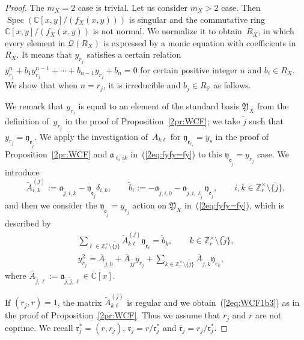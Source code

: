 \documentclass[pdftex]{sigma}
\def\CC{{\mathbb C}}
\def\ZZ{{\mathbb Z}}
\def\PP{{\mathbb P}}
\def\cQ{{\mathcal Q}}
\def\fY{{\mathfrak Y}}
\def\fa{{\mathfrak a}}
\def\fe{{\mathfrak e}}
\def\fr{{\mathfrak r}}
\def\fy{{\mathfrak y}}
\def\tA{{\widetilde A}}
\def\tb{{\widetilde b}}
\def\tj{{\widetilde j}}
\def\BA{{\overline A}}
\def\Bfr{{\overline{\mathfrak r}}}
\def\Spec{\operatorname{Spec}}
\numberwithin{equation}{section}
\begin{document}
\begin{proof}The $m_X=2$ case is trivial.
Let us consider $m_X>2$ case. Then $\Spec(\CC[x,y]/(f_X(x,y)))$ is singular and the commutative ring $\CC[x,y]/(f_X(x,y))$ is not normal.
We normalize it to obtain~$R_X$, in which every element in $\cQ(R_X)$ is expressed by a monic equation with coefficients in $R_X$.
It means that $y_{r_j}$ satisfies a certain relation $y_{r_j}^n+b_1 y_{r_j}^{n-1}+\cdots+b_{n-1} y_{r_j} + b_n=0$ for certain positive integer $n$ and $b_i \in R_X$.
We show that when $n=r_j$, it is irreducible and $b_j \in R_\PP$ as follows.

We remark that $y_{r_j}$ is equal to an element of the standard basis $\fY_X$ from the definition of~$y_{r_j}$ in the proof of Proposition~\ref{2pr:WCF};
we take $\tj$ such that $y_{r_j}=\fy_{\fe_{\tj}}$.
We apply the investigation of~$A_{k\ell}$ for $\fy_{\fe_{\ell_s}}=y_s$ in the proof of Proposition~\ref{2pr:WCF} and $\fa_{\ell_s i k}$ in~(\ref{2eq:fyfy=fy}) to this $\fy_{\fe_{\tj}}=y_{r_j}$ case.
We introduce
\begin{equation*}
\tA^{(j)}_{i,k}:=\fa_{\tj, i, k}-\fy_{\fe_\tj}\delta_{i,k}, \qquad
\tb_i:=-\fa_{\tj,i,0}-\fa_{\tj,i,\ell_\tj}\fy_{\fe_{\tj}}, \qquad
i, k \in \ZZ_r^\times\setminus\big\{\tj\big\},%
\end{equation*}
and then we consider the $\fy_{\fe_{\tj}}=y_{r_j}$ action on $\fY_X$ in~(\ref{2eq:fyfy=fy}), which is described by{\samepage
\begin{gather}
\sum_{\ell \in \ZZ_r^\times\setminus\{\tj \}} \tA^{(j)}_{k\ell}\fy_{\fe_\ell}=\tb_k,
\qquad k \in \ZZ_r^\times \setminus\big\{\tj\big\},\label{2eq:Aeta_b02}
\\
y_{r_j}^2= \BA_{\tj,0}+\BA_{\tj\tj}y_{r_j}+
\sum_{k \in \ZZ_r^\times\setminus\{\tj \}} \BA_{\tj,k} \fy_{e_k},\label{2eq:Aeta_b02a}
\end{gather}
where $\BA_{\tj,\ell}:=\fa_{\tj, \tj, \ell}\in \CC[x]$.}

If $(r_j, r)=1$, the matrix $\tA^{(j)}_{k\ell}$ is regular and we obtain~(\ref{2eq:WCF1b3}) as in the proof of Proposition~\ref{2pr:WCF}.
Thus we assume that $r_j$ and $r$ are not coprime.
We recall $\fr_j^*=(r, r_j)$, $\fr_j=r/\fr_j^*$ and $\Bfr_j=r_j/\fr_j^*$.


\end{proof}
\end{document}
